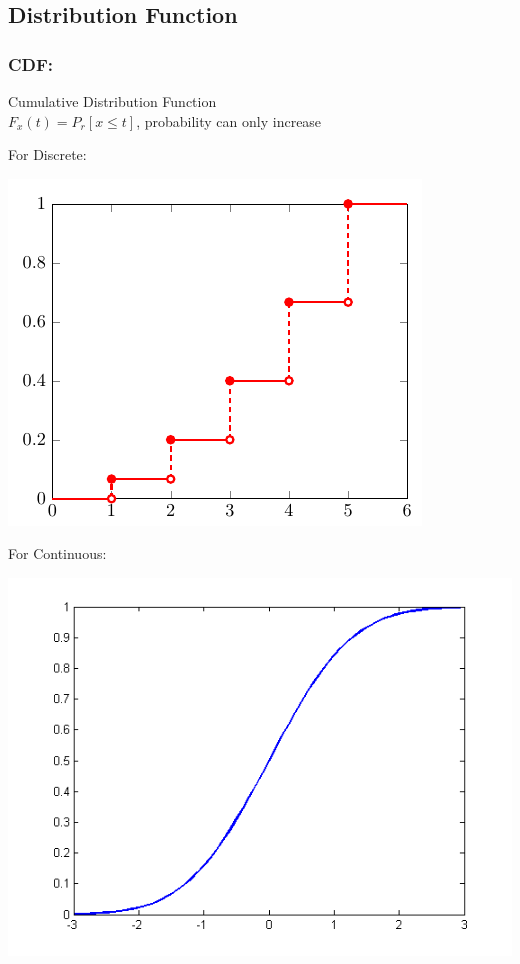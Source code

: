 \documentclass{article}
\begin{document}
    \subsection{Distribution Function}{
        \subsubsection{CDF: }{
            Cumulative Distribution Function\\
            $ F_x(t)= P_r[x\le t]$, probability can only increase\\

            \begin{enumerate}{
                \item For Discrete:
                    \begin{center}{
                        \includegraphics[scale=0.3]{dis-cdf.png}
                    }
                    \end{center} 
                \item For Continuous:
                    \begin{center}{
                        \includegraphics[scale=0.3]{con-cdf.png}
                    }
                    \end{center}  
            }
            \end{enumerate}  
        }
}
\end{document}
